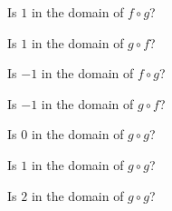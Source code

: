 \documentclass{ximera}
\begin{document}
\begin{question}

Is $1$ in the domain of $f \circ g$?

\begin{multipleChoice}
\end{multipleChoice}


Is $1$ in the domain of $g \circ f$?

\begin{multipleChoice}
\end{multipleChoice}


\end{question}









\begin{question}

Is $-1$ in the domain of $f \circ g$?

\begin{multipleChoice}
\end{multipleChoice}


Is $-1$ in the domain of $g \circ f$?

\begin{multipleChoice}
\end{multipleChoice}


\end{question}






\begin{question}

Is $0$ in the domain of $g \circ g$?

\begin{multipleChoice}
\end{multipleChoice}


Is $1$ in the domain of $g \circ g$?

\begin{multipleChoice}
\end{multipleChoice}



Is $2$ in the domain of $g \circ g$?

\begin{multipleChoice}
\end{multipleChoice}



\end{question}
\end{document}
